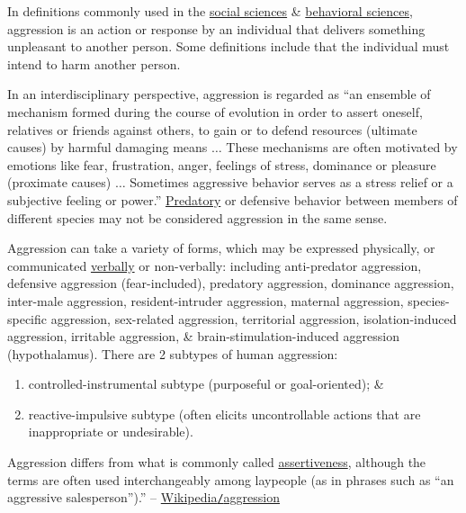 \documentclass[oneside]{book}
\numberwithin{equation}{section}
\begin{document}
In definitions commonly used in the \href{https://en.wikipedia.org/wiki/Social_sciences}{social sciences} \& \href{https://en.wikipedia.org/wiki/Behavioral_science}{behavioral sciences}, aggression is an action or response by an individual that delivers something unpleasant to another person. Some definitions include that the individual must intend to harm another person.

In an interdisciplinary perspective, aggression is regarded as ``an ensemble of mechanism formed during the course of evolution in order to assert oneself, relatives or friends against others, to gain or to defend resources (ultimate causes) by harmful damaging means $\ldots$ These mechanisms are often motivated by emotions like fear, frustration, anger, feelings of stress, dominance or pleasure (proximate causes) $\ldots$ Sometimes aggressive behavior serves as a stress relief or a subjective feeling or power.'' \href{https://en.wikipedia.org/wiki/Predation}{Predatory} or defensive behavior between members of different species may not be considered aggression in the same sense.

Aggression can take a variety of forms, which may be expressed physically, or communicated \href{https://en.wikipedia.org/wiki/Verbal_aggressiveness}{verbally} or non-verbally: including anti-predator aggression, defensive aggression (fear-included), predatory aggression, dominance aggression, inter-male aggression, resident-intruder aggression, maternal aggression, species-specific aggression, sex-related aggression, territorial aggression, isolation-induced aggression, irritable aggression, \& brain-stimulation-induced aggression (hypothalamus). There are 2 subtypes of human aggression:
\begin{enumerate}
	\item controlled-instrumental subtype (purposeful or goal-oriented); \&
	\item reactive-impulsive subtype (often elicits uncontrollable actions that are inappropriate or undesirable).
\end{enumerate}
Aggression differs from what is commonly called \href{https://en.wikipedia.org/wiki/Assertiveness}{assertiveness}, although the terms are often used interchangeably among laypeople (as in phrases such as ``an aggressive salesperson'').'' -- \href{https://en.wikipedia.org/wiki/Aggression}{Wikipedia\texttt{/}aggression}
\end{document}
